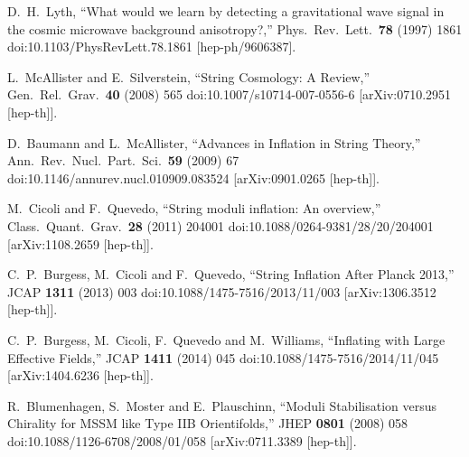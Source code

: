\documentclass[11pt,a4paper]{article}
\begin{document}
\begin{thebibliography}{99}

  D.~H.~Lyth,
  ``What would we learn by detecting a gravitational wave signal in the cosmic microwave background anisotropy?,''
  Phys.\ Rev.\ Lett.\  {\bf 78} (1997) 1861
  doi:10.1103/PhysRevLett.78.1861
  [hep-ph/9606387].
  
  L.~McAllister and E.~Silverstein,
  ``String Cosmology: A Review,''
  Gen.\ Rel.\ Grav.\  {\bf 40} (2008) 565
  doi:10.1007/s10714-007-0556-6
  [arXiv:0710.2951 [hep-th]].

  D.~Baumann and L.~McAllister,
  ``Advances in Inflation in String Theory,''
  Ann.\ Rev.\ Nucl.\ Part.\ Sci.\  {\bf 59} (2009) 67
  doi:10.1146/annurev.nucl.010909.083524
  [arXiv:0901.0265 [hep-th]].

  M.~Cicoli and F.~Quevedo,
  ``String moduli inflation: An overview,''
  Class.\ Quant.\ Grav.\  {\bf 28} (2011) 204001
  doi:10.1088/0264-9381/28/20/204001
  [arXiv:1108.2659 [hep-th]].
  
  C.~P.~Burgess, M.~Cicoli and F.~Quevedo,
  ``String Inflation After Planck 2013,''
  JCAP {\bf 1311} (2013) 003
  doi:10.1088/1475-7516/2013/11/003
  [arXiv:1306.3512 [hep-th]].
	
  C.~P.~Burgess, M.~Cicoli, F.~Quevedo and M.~Williams,
  ``Inflating with Large Effective Fields,''
  JCAP {\bf 1411} (2014) 045
  doi:10.1088/1475-7516/2014/11/045
  [arXiv:1404.6236 [hep-th]].

  R.~Blumenhagen, S.~Moster and E.~Plauschinn,
  ``Moduli Stabilisation versus Chirality for MSSM like Type IIB Orientifolds,''
  JHEP {\bf 0801} (2008) 058
  doi:10.1088/1126-6708/2008/01/058
  [arXiv:0711.3389 [hep-th]].


\end{thebibliography}
\end{document}
